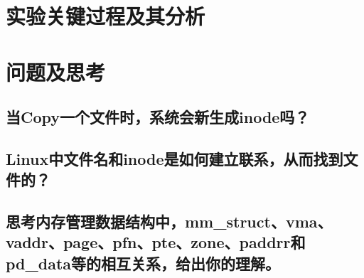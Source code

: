 \documentclass{whureport}
\begin{document}
\section{实验关键过程及其分析}





\section{问题及思考}
\subsection{当Copy一个文件时，系统会新生成inode吗？}



\subsection{Linux中文件名和inode是如何建立联系，从而找到文件的？}





\subsection{思考内存管理数据结构中，mm\_struct、vma、vaddr、page、pfn、pte、zone、paddrr和pd\_data等的相互关系，给出你的理解。}
\end{document}
